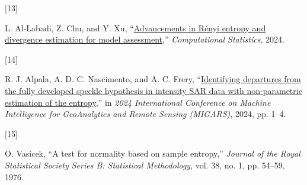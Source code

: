 \documentclass[
  lettersize  journal,
]{IEEEtran}%
\newlength{\cslhangindent}
\newlength{\csllabelwidth}
\newenvironment{CSLReferences}[2] %
 {\begin{list}{}{%
  \setlength{\itemindent}{0pt}
  \setlength{\leftmargin}{0pt}
  \setlength{\parsep}{0pt}
  \ifodd #1
   \setlength{\leftmargin}{\cslhangindent}
   \setlength{\itemindent}{-1\cslhangindent}
  \fi
  \setlength{\itemsep}{#2\baselineskip}}}
 {\end{list}}
\newcommand{\CSLLeftMargin}[1]{\parbox[t]{\csllabelwidth}{\strut#1\strut}}
\newcommand{\CSLRightInline}[1]{\parbox[t]{\linewidth - \csllabelwidth}{\strut#1\strut}}
\providecommand{\DIFaddbegin}{} %
\providecommand{\DIFaddend}{} %
\providecommand{\DIFdelbegin}{} %
\providecommand{\DIFdelend}{} %
\newcommand{\DIFscaledelfig}{0.5}
\newlength{\DIFdelgraphicswidth} %
\newlength{\DIFdelgraphicsheight} %
\newcommand{\DIFaddincludegraphics}[2][]{{\color{blue}\fbox{\DIFOincludegraphics[#1]{#2}}}} %
\newcommand{\DIFdelincludegraphics}[2][]{%
\sbox{\DIFdelgraphicsbox}{\DIFOincludegraphics[#1]{#2}}%
\settoboxwidth{\DIFdelgraphicswidth}{\DIFdelgraphicsbox} %
\settoboxtotalheight{\DIFdelgraphicsheight}{\DIFdelgraphicsbox} %
\scalebox{\DIFscaledelfig}{%
\parbox[b]{\DIFdelgraphicswidth}{\usebox{\DIFdelgraphicsbox}\\[-\baselineskip] \rule{\DIFdelgraphicswidth}{0em}}\llap{\resizebox{\DIFdelgraphicswidth}{\DIFdelgraphicsheight}{%
\setlength{\unitlength}{\DIFdelgraphicswidth}%
\begin{picture}(1,1)%
\thicklines\linethickness{2pt} %
{\color[rgb]{1,0,0}\put(0,0){\framebox(1,1){}}}%
{\color[rgb]{1,0,0}\put(0,0){\line( 1,1){1}}}%
{\color[rgb]{1,0,0}\put(0,1){\line(1,-1){1}}}%
\end{picture}%
}\hspace*{3pt}}} %
} %
\DeclareRobustCommand{\DIFaddbegin}{\DIFOaddbegin \let\includegraphics\DIFaddincludegraphics} %
\DeclareRobustCommand{\DIFaddend}{\DIFOaddend \let\includegraphics\DIFOincludegraphics} %
\DeclareRobustCommand{\DIFdelbegin}{\DIFOdelbegin \let\includegraphics\DIFdelincludegraphics} %
\DeclareRobustCommand{\DIFdelend}{\DIFOaddend \let\includegraphics\DIFOincludegraphics} %
\begin{document}
\begin{CSLReferences}{0}{0}
\DIFdelbegin {}
\DIFdelend \DIFaddbegin {}
\DIFaddend \CSLLeftMargin{{[}13{]} }%
\DIFdelbegin %
\DIFdelend \DIFaddbegin \CSLRightInline{L. Al-Labadi, Z. Chu, and Y. Xu,
{``\href{https://doi.org/10.1007/s00180-024-01507-z}{Advancements in
{R}ényi entropy and divergence estimation for model assessment},''}
\emph{Computational Statistics}, 2024. }
\DIFaddend 

\DIFdelbegin {}
\DIFdelend \DIFaddbegin {}
\DIFaddend \CSLLeftMargin{{[}14{]} }%
\DIFdelbegin %
\DIFdelend \DIFaddbegin \CSLRightInline{R. J. Alpala, A. D. C. Nascimento, and A. C. Frery,
{``\href{https://doi.org/10.1109/migars61408.2024.10544448}{Identifying
departures from the fully developed speckle hypothesis in intensity
{SAR} data with non-parametric estimation of the entropy},''} in
\emph{2024 {I}nternational {C}onference on {M}achine {I}ntelligence for
{G}eo{A}nalytics and {R}emote {S}ensing ({MIGARS})}, 2024, pp. 1--4. }
\DIFaddend 

\DIFdelbegin {}
\DIFdelend \DIFaddbegin {}
\DIFaddend \CSLLeftMargin{{[}15{]} }%
\DIFdelbegin %


\DIFdelend \CSLRightInline{O. Vasicek, {``A test for normality based on sample
entropy,''} \emph{Journal of the Royal Statistical Society Series B:
Statistical Methodology}, vol. 38, no. 1, pp. 54--59, 1976. }


\end{CSLReferences}
\end{document}
